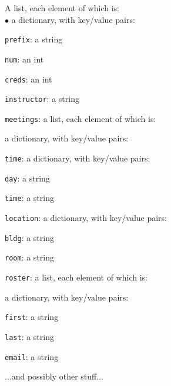 \documentclass[12pt]{article}
\begin{document}
\large
\noindent A list, each element of which is:\\
$\bullet$ a dictionary, with key/value pairs:
        \begin{compactenum}
        \item \texttt{prefix}: a string
        \item \texttt{num}: an int
        \item \texttt{creds}: an int
        \item \texttt{instructor}: a string
        \item \texttt{meetings}: a list, each element of which is:
            \begin{compactitem}
            \item a dictionary, with key/value pairs:
                \begin{compactenum}
                \item \texttt{time}: a dictionary, with key/value pairs:
                    \begin{compactenum}
                    \item \texttt{day}: a string
                    \item \texttt{time}: a string
                    \end{compactenum}
                \item \texttt{location}: a dictionary, with key/value pairs:
                    \begin{compactenum}
                    \item \texttt{bldg}: a string
                    \item \texttt{room}: a string
                    \end{compactenum}
                \end{compactenum}
            \end{compactitem}
        \item \texttt{roster}: a list, each element of which is:
            \begin{compactitem}
            \item a dictionary, with key/value pairs:
                \begin{compactenum}
                \item \texttt{first}: a string
                \item \texttt{last}: a string
                \item \texttt{email}: a string
                \end{compactenum}
            \end{compactitem}
        \item ...and possibly other stuff...
        \end{compactenum}
\end{document}
